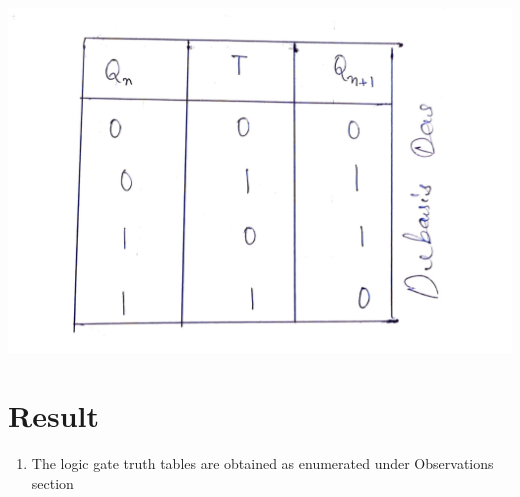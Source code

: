 \begin{center}
    \includegraphics[scale = 0.15]{Documents/1616517802679.jpg}
\end{center}
\section{Result}
\begin{enumerate}
    \item The logic gate truth tables are obtained as enumerated under Observations section
\end{enumerate}
